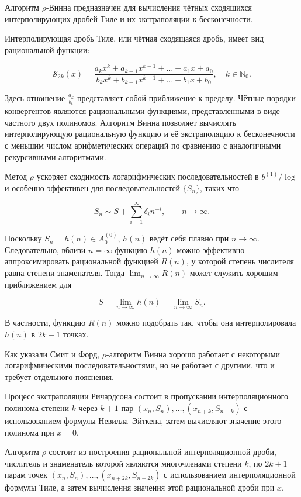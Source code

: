 \documentclass[14pt, a4paper]{extarticle}
\theoremstyle{definition}
\theoremstyle{remark}
\begin{document}
Алгоритм \(\rho\)-Винна предназначен для вычисления чётных сходящихся
интерполирующих дробей Тиле и их экстраполяции к бесконечности.

Интерполирующая дробь Тиле, или чётная сходящаяся дробь, имеет вид
рациональной функции:

\[
\mathcal{S}_{2k}(x) =
\frac{a_{k}x^{k} + a_{k - 1}x^{k - 1} + \ldots + a_{1}x + a_{0}}
     {b_{k}x^{k} + b_{k - 1}x^{k - 1} + \ldots + b_{1}x + b_{0}},
\quad k \in \mathbb{N}_{0}.
\]

Здесь отношение \(\frac{a_{k}}{b_{k}}\) представляет собой приближение к
пределу. Чётные порядки конвергентов являются рациональными функциями,
представленными в виде частного двух полиномов. Алгоритм Винна позволяет
вычислять интерполирующую рациональную функцию и её экстраполяцию к
бесконечности с меньшим числом арифметических операций по сравнению с
аналогичными рекурсивными алгоритмами.

Метод \(\rho\) ускоряет сходимость логарифмических последовательностей в
\(b^{(1)}/\log\) и особенно эффективен для последовательностей
\(\{ S_{n} \}\), таких что

\[
S_{n} \sim S + \sum_{i = 1}^{\infty} \delta_{i} n^{-i},
\qquad n \to \infty.
\]

Поскольку \(S_{n} = h(n) \in A_{0}^{(0)}\),
\(h(n)\) ведёт себя плавно при \(n \to \infty\).
Следовательно, вблизи \(n = \infty\) функцию \(h(n)\)
можно эффективно аппроксимировать рациональной функцией \(R(n)\),
у которой степень числителя равна степени знаменателя.
Тогда \(\lim_{n \to \infty} R(n)\) может служить хорошим приближением для

\[
S = \lim_{n \to \infty} h(n) = \lim_{n \to \infty} S_{n}.
\]

В частности, функцию \(R(n)\) можно подобрать так, чтобы она интерполировала
\(h(n)\) в \(2k+1\) точках.

Как указали Смит и Форд, \(\rho\)-алгоритм Винна хорошо работает с
некоторыми логарифмическими последовательностями, но не работает с
другими, что и требует отдельного пояснения.

Процесс экстраполяции Ричардсона состоит в пропускании интерполяционного
полинома степени \(k\) через \(k + 1\) пар \((x_{n}, S_{n}), \ldots,
(x_{n+k}, S_{n+k})\) с использованием формулы Невилла–Эйткена,
затем вычисляют значение этого полинома при \(x = 0\).

Алгоритм \(\rho\) состоит из построения рациональной интерполяционной
дроби, числитель и знаменатель которой являются многочленами степени \(k\),
по \(2k+1\) парам точек \((x_{n}, S_{n}), \ldots, (x_{n+2k}, S_{n+2k})\)
с использованием интерполяционной формулы Тиле, а затем вычисления значения
этой рациональной дроби при \(x\).
\end{document}

